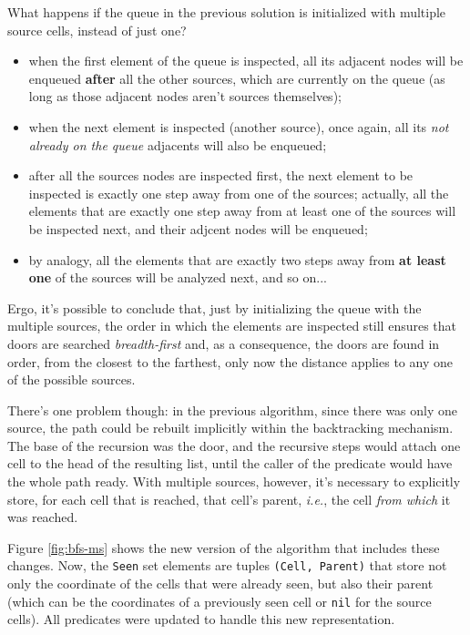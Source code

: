 \documentclass[12pt,a4paper]{article}
\newcommand{\varname}[1]{\texttt{#1}}
\begin{document}
What happens if the queue in the previous solution is initialized with multiple source cells, instead of just one?
\begin{itemize}
    \item when the first element of the queue is inspected, all its adjacent nodes will be enqueued \textbf{after} all the other sources, which are currently on the queue (as long as those adjacent nodes aren't sources themselves);
    
    \item when the next element is inspected (another source), once again, all its \textit{not already on the queue} adjacents will also be enqueued;
    
    \item after all the sources nodes are inspected first, the next element to be inspected is exactly one step away from one of the sources; actually, all the elements that are exactly one step away from at least one of the sources will be inspected next, and their adjcent nodes will be enqueued;
    
    \item by analogy, all the elements that are exactly two steps away from \textbf{at least one} of the sources will be analyzed next, and so on...
\end{itemize}

Ergo, it's possible to conclude that, just by initializing the queue with the multiple sources, the order in which the elements are inspected still ensures that doors are searched \textit{breadth-first} and, as a consequence, the doors are found in order, from the closest to the farthest, only now the distance applies to any one of the possible sources.

There's one problem though: in the previous algorithm, since there was only one source, the path could be rebuilt implicitly within the backtracking mechanism. The base of the recursion was the door, and the recursive steps would attach one cell to the head of the resulting list, until the caller of the predicate would have the whole path ready. With multiple sources, however, it's necessary to explicitly store, for each cell that is reached, that cell's parent, \textit{i.e.}, the cell \textit{from which} it was reached.

Figure \ref{fig:bfs-ms} shows the new version of the algorithm that includes these changes. Now, the \varname{Seen} set elements are tuples \varname{(Cell, Parent)} that store not only the coordinate of the cells that were already seen, but also their parent (which can be the coordinates of a previously seen cell or \varname{nil} for the source cells). All predicates were updated to handle this new representation.
\end{document}
